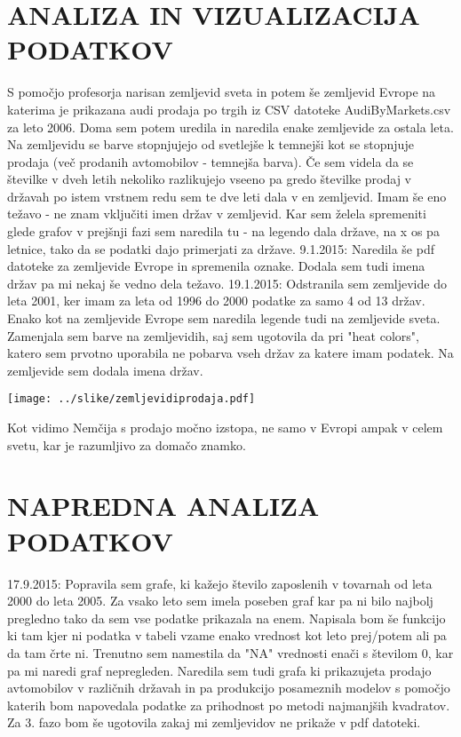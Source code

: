 \documentclass[11pt,a4paper]{article}
\begin{document}
\section{ANALIZA IN VIZUALIZACIJA PODATKOV}
S pomočjo profesorja narisan zemljevid sveta in potem še zemljevid Evrope na katerima je prikazana audi prodaja po trgih iz CSV datoteke AudiByMarkets.csv za leto 2006. Doma sem potem uredila in naredila enake zemljevide za ostala leta. Na zemljevidu se barve stopnjujejo od svetlejše k temnejši kot se stopnjuje prodaja (več prodanih avtomobilov - temnejša barva). Če sem videla da se številke v dveh letih nekoliko razlikujejo vseeno pa gredo številke prodaj v državah po istem vrstnem redu sem te dve leti dala v en zemljevid. Imam še eno težavo - ne znam vključiti imen držav v zemljevid. Kar sem želela spremeniti glede grafov v prejšnji fazi sem naredila tu - na legendo dala države, na x os pa letnice, tako da se podatki dajo primerjati za države.
9.1.2015: Naredila še pdf datoteke za zemljevide Evrope in spremenila oznake. Dodala sem tudi imena držav pa mi nekaj še vedno dela težavo.
19.1.2015: Odstranila sem zemljevide do leta 2001, ker imam za leta od 1996 do 2000 podatke za samo 4 od 13 držav. Enako kot na zemljevide Evrope sem naredila legende tudi na zemljevide sveta. Zamenjala sem barve na zemljevidih, saj sem ugotovila da pri "heat colors", katero sem prvotno uporabila ne pobarva vseh držav za katere imam podatek. Na zemljevide sem dodala imena držav. 


\texttt{[image: ../slike/zemljevidiprodaja.pdf]}

Kot vidimo Nemčija s prodajo močno izstopa, ne samo v Evropi ampak v celem svetu, kar je razumljivo za domačo znamko.


\section{NAPREDNA ANALIZA PODATKOV}

17.9.2015: Popravila sem grafe, ki kažejo število zaposlenih v tovarnah od leta 2000 do leta 2005. Za vsako leto sem imela poseben graf kar pa ni bilo najbolj pregledno tako da sem vse podatke prikazala na enem. Napisala bom še funkcijo ki tam kjer ni podatka v tabeli vzame enako vrednost kot leto prej/potem ali pa da tam črte ni. Trenutno sem namestila da "NA" vrednosti enači s številom 0, kar pa mi naredi graf nepregleden. Naredila sem tudi grafa ki prikazujeta prodajo avtomobilov v različnih državah in pa produkcijo posameznih modelov s pomočjo katerih bom napovedala podatke za prihodnost po metodi najmanjših kvadratov. Za 3. fazo bom še ugotovila zakaj mi zemljevidov ne prikaže v pdf datoteki.
\end{document}
